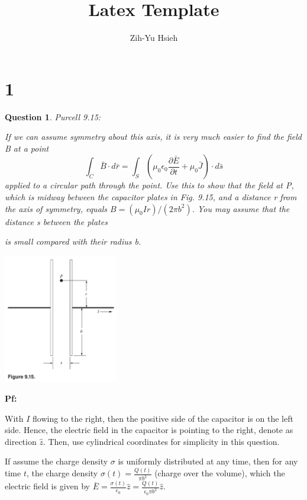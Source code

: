 \documentclass{article}
\title{Latex Template}
\author{Zih-Yu Hsieh}
\newtheorem{question}{Question}
\begin{document}
\maketitle

\section*{1}
\begin{myBox}[]{}
    \begin{question}
        Purcell 9.15:

        If we can assume symmetry
        about this axis, it is very much easier to find the field B at a point
        $$\int_C\bar{B}\cdot d\bar{r} = \int_S\left(\mu_0\epsilon_0\frac{\partial \bar{E}}{\partial t}+\mu_0\bar{J}\right)\cdot d\bar{s}$$
        applied to a circular path through the point. Use this to show that
        the field at P, which is midway between the capacitor plates in
        Fig. 9.15, and a distance r from the axis of symmetry, equals $B=(\mu_0Ir)/(2\pi b^2)$. 
        You may assume that the distance s between the plates

        is small compared with their radius b.

        \begin{center}
            \includegraphics*[width=50mm]{phys 24 hw 5 p1.png}
        \end{center}
    \end{question}
\end{myBox}

\textbf{Pf:}

With $I$ flowing to the right, then the positive side of the capacitor is on the left side. Hence, the electric field in the capacitor is pointing to the right, denote as direction $\hat{z}$.
Then, use cylindrical coordinates for simplicity in this question.

If assume the charge density $\sigma$ is uniformly distributed at any time, then for any time $t$, the charge density $\sigma(t)=\frac{Q(t)}{\pi b^2}$ (charge over the volume),
which the electric field is given by $\bar{E}=\frac{\sigma(t)}{\epsilon_0}\hat{z} = \frac{Q(t)}{\epsilon_0\pi b^2}\hat{z}$.
\end{document}
